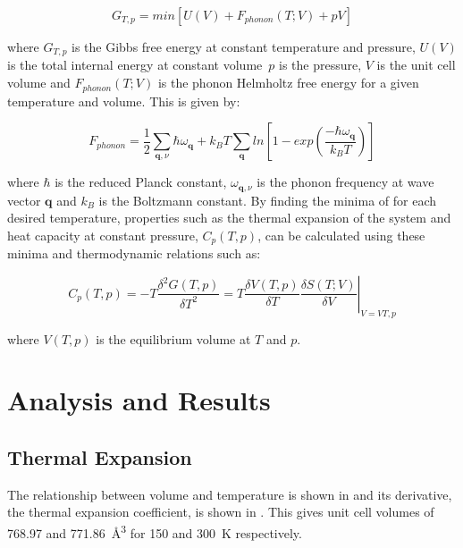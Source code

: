 \begin{equation}
G_{T,p} = min[U(V) + F_{phonon}(T;V) + pV]
\label{eqn:qha_G}
\end{equation}


where \(G_{T,p}\) is the Gibbs free energy at constant temperature and pressure, \(U(V)\) is the total internal energy at constant volume\ \(p\) is the pressure, \(V\) is the unit cell volume and \(F_{phonon}(T;V)\) is the phonon Helmholtz free energy for a given temperature and volume. This is given by:

\begin{equation}
F_{phonon} = \frac{1}{2} \sum_{\textbf{q},\nu} \hbar\omega_{\textbf{q}} + k_BT \sum_{\textbf{q}} ln[1 - exp({\frac{-\hbar \omega_{\textbf{q}}}{k_BT}})]
\end{equation}

where \(\hbar\) is the reduced Planck constant, \(\omega_{\textbf{q},\nu}\) is the phonon frequency at wave vector \(\textbf{q}\) and \(k_B\) is the Boltzmann constant. By finding the minima of  for each desired temperature, properties such as the thermal expansion of the system and heat capacity at constant pressure, \(C_p(T,p)\), can be calculated using these minima and thermodynamic relations such as:

\begin{equation}
C_p(T,p) = \left. -T\frac{\delta^2G(T,p)}{\delta T^2} = T\frac{\delta V(T,p)}{\delta T} \frac{\delta S(T;V)}{\delta V} \right\rvert_{V=V{T,p}}
\end{equation}

where \(V(T,p)\) is the equilibrium volume at \(T\) and \(p\).

\section{Analysis and Results}
\subsection{Thermal Expansion}
The relationship between volume and temperature is shown in  and its derivative, the thermal expansion coefficient, is shown in . This gives unit cell volumes of 768.97 and \SI{771.86}{\angstrom^3} for 150 and \SI{300}{K} respectively. 

